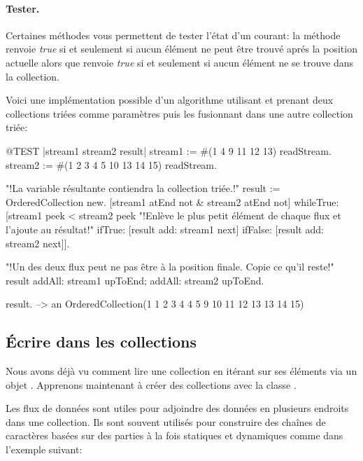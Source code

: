 \documentclass[a4paper,10pt,twoside]{book}
\begin{document}
\paragraph{Tester.} Certaines méthodes vous permettent de tester l'état d'un \stream courant: 
la méthode  renvoie \emph{true} si et seulement si aucun élément ne peut être trouvé aprés la position actuelle alors que  renvoie \emph{true} si et seulement si aucun élément ne se trouve dans la collection.

Voici une implémentation possible d'un algorithme utilisant  et prenant deux collections triées comme paramètres puis les fusionnant dans une autre collection triée:

\begin{code}{@TEST |stream1 stream2 result|}
stream1 := #(1 4 9 11 12 13) readStream.
stream2 := #(1 2 3 4 5 10 13 14 15) readStream.

"!La variable résultante contiendra la collection triée.!"
result := OrderedCollection new.
[stream1 atEnd not & stream2 atEnd not]
  whileTrue: [stream1 peek < stream2 peek
    "!Enlève le plus petit élément de chaque flux et l'ajoute au résultat!"
    ifTrue: [result add: stream1 next]
    ifFalse: [result add: stream2 next]].

"!Un des deux flux peut ne pas être à la position finale. Copie ce qu'il reste!"
result
  addAll: stream1 upToEnd;
  addAll: stream2 upToEnd.

result. -->   an OrderedCollection(1 1 2 3 4 4 5 9 10 11 12 13 13 14 15)
\end{code}

\subsection{Écrire dans les collections}

Nous avons déjà vu comment lire une collection en itérant sur ses
éléments via un objet . Apprenons maintenant à créer
des collections avec la classe .

Les flux de données  sont utiles pour adjoindre des données en plusieurs endroits dans une collection. Ils sont souvent utilisés pour construire des chaînes de caractères basées sur des parties à la fois statiques et dynamiques comme dans l'exemple suivant:
\end{document}
